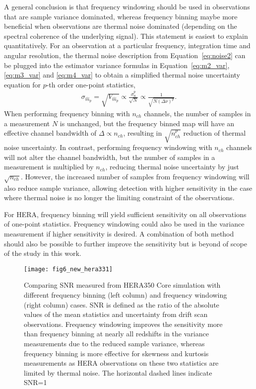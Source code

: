 \documentclass[fleqn,usenatbib]{mnras}
\begin{document}
A general conclusion is that frequency windowing should be used in observations that are sample variance dominated, whereas frequency binning maybe more beneficial when observations are thermal noise dominated (depending on the spectral coherence of the underlying signal). This statement is easiest to explain quantitatively. For an observation at a particular frequency, integration time and angular resolution, the thermal noise description from Equation~\ref{eq:noise2} can be plugged into the estimator variance formulas in Equation~\ref{eq:m2_var}, \ref{eq:m3_var} and \ref{eq:m4_var} to obtain a simplified thermal noise uncertainty equation for $p$-th order one-point statistics, 
\begin{gather}
    \sigma_{\hat{m}_p} = \sqrt{V_{\hat{m}_p}} \propto \frac{\sigma_n^{p}}{\sqrt{N}} \propto \frac{1}{\sqrt{N(\Delta \nu)^p}}.
\end{gather}
When performing frequency binning with $n_{ch}$ channels, the number of samples in a measurement $N$ is unchanged, but the frequency binned map will have an effective channel bandwidth of $\Delta \propto n_{ch}$, resulting in $\sqrt{n_{ch}^p}$ reduction of thermal noise uncertainty. In contrast, performing frequency windowing with $n_{ch}$ channels will not alter the channel bandwidth, but the number of samples in a measurement is multiplied by $n_{ch}$, reducing thermal noise uncertainty by just $\sqrt{n_{ch}}$. However, the increased number of samples from frequency windowing will also reduce sample variance, allowing detection with higher sensitivity in the case where thermal noise is no longer the limiting constraint of the observations.

For HERA, frequency binning will yield sufficient sensitivity on all observations of one-point statistics. Frequency windowing could also be used in the variance measurement if higher sensitivity is desired. A combination of both method should also be possible to further improve the sensitivity but is beyond of scope of the study in this work.

\begin{figure*}
    \texttt{[image: fig6\_new\_hera331]}
    \caption{Comparing SNR measured from HERA350 Core simulation with different frequency binning (left column) and frequency windowing (right column) cases. SNR is defined as the ratio of the absolute values of the mean statistics and uncertainty from drift scan observations. Frequency windowing improves the sensitivity more than frequency binning at nearly all redshifts in the variance measurements due to the reduced sample variance, whereas frequency binning is more effective for skewness and kurtosis measurements as HERA observations on these two statistics are limited by thermal noise. The horizontal dashed lines indicate SNR=1}
    \label{fig:snr_bw_hera350}
\end{figure*}
\end{document}
